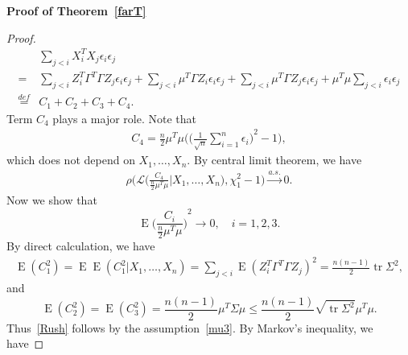 \documentclass[review]{elsarticle}
\DeclareMathOperator{\mytr}{tr}
\DeclareMathOperator{\myE}{E}
\theoremstyle{plain}
\theoremstyle{definition}
\theoremstyle{remark}
\begin{document}
\textbf{Proof of Theorem~\ref{farT}}

\begin{proof}
    \begin{equation*}
        \begin{aligned}
            &\sum_{j<i} X_i^T X_j \epsilon_i\epsilon_j\\
            =&
            \sum_{j<i} Z_i^T \Gamma^T \Gamma Z_j \epsilon_i\epsilon_j
            +
            \sum_{j<i} \mu^T \Gamma Z_i \epsilon_i\epsilon_j
            +\sum_{j<i} \mu^T \Gamma Z_j \epsilon_i\epsilon_j+
            \mu^T \mu \sum_{j<i} \epsilon_i\epsilon_j\\
            \overset{def}{=}&C_1+C_2+C_3+C_4.
        \end{aligned}
    \end{equation*}
Term $C_4$ plays a major role. Note that
    \begin{equation*}
        \begin{aligned}
            C_4=\frac{n}{2}\mu^T \mu\Big({\Big(\frac{1}{\sqrt{n}}\sum_{i=1}^n \epsilon_i\Big)}^2-1\Big),
        \end{aligned}
    \end{equation*}
    which does not depend on $X_1,\ldots,X_n$.
By central limit theorem, we have
    \begin{equation}\label{Rush2}
        \begin{aligned}
            \rho\Big(\mathcal{L}\Big(\frac{C_4}{\frac{n}{2}\mu^T \mu}\Big| X_1,\ldots,X_n\Big),\chi^2_1-1\Big)\xrightarrow{a.s.} 0.
        \end{aligned}
    \end{equation}
Now we show that
    \begin{equation}\label{Rush}
    \myE{\Big(\frac{C_i}{\frac{n}{2}\mu^T\mu}\Big)}^2\to 0,
    \quad i=1,2,3.
    \end{equation}
    By direct calculation, we have
    \begin{equation*}
    \begin{aligned}
    \myE(C_1^2)=\myE\myE(C_1^2|X_1,\ldots,X_n)
    =\sum_{j<i}\myE{(Z_i^T \Gamma^T \Gamma Z_j)}^2=\frac{n(n-1)}{2}\mytr \Sigma^2,
    \end{aligned}
\end{equation*}
    and
    \begin{equation*}
    \myE(C_2^2)=\myE(C_3^2)=\frac{n(n-1)}{2}\mu^T \Sigma \mu\leq \frac{n(n-1)}{2}\sqrt{\mytr \Sigma^2}\mu^T\mu.
    \end{equation*}
    Thus~\eqref{Rush} follows by the assumption~\eqref{mu3}. By Markov's inequality, we have

\end{proof}
\end{document}
